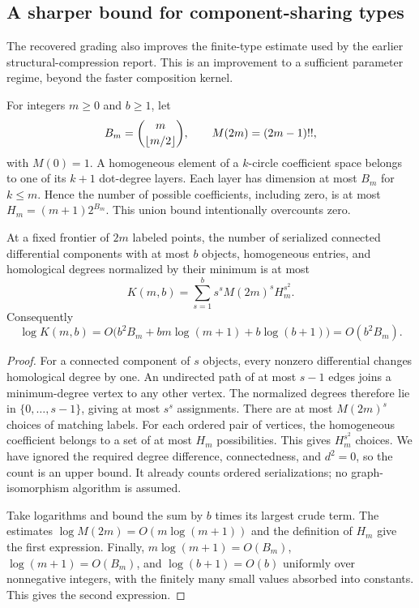 \subsection{A sharper bound for component-sharing types}
\label{sec:types}

The recovered grading also improves the finite-type estimate used by the
earlier structural-compression report. This is an improvement to a
sufficient parameter regime, beyond the faster composition kernel.

For integers $m\geq0$ and $b\geq1$, let
\[
 B_m=\binom{m}{\left\lfloor m/2\right\rfloor},\qquad M(2m)=(2m-1)!!,
\]
with $M(0)=1$. A homogeneous element of a $k$-circle coefficient space
belongs to one of its $k+1$ dot-degree layers. Each layer has dimension
at most $B_m$ for $k\leq m$. Hence the number of possible coefficients,
including zero, is at most $H_m=(m+1)2^{B_m}$. This union bound
intentionally overcounts zero.

\begin{theorem}
\label{thm:types}
At a fixed frontier of $2m$ labeled points, the number of serialized
connected differential components with at most $b$ objects, homogeneous
entries, and homological degrees normalized by their minimum is at most
\begin{equation}
 K(m,b)=\sum_{s=1}^{b}s^s M(2m)^s H_m^{s^2}.
 \label{eq:types}
\end{equation}
Consequently
\begin{equation}
 \log K(m,b)=O\bigl(b^2 B_m+b m\log(m+1)+b\log(b+1)\bigr)
 =O(b^2 B_m).
 \label{eq:typecost}
\end{equation}
\end{theorem}
\begin{proof}
For a connected component of $s$ objects, every nonzero differential
changes homological degree by one. An undirected path of at most $s-1$
edges joins a minimum-degree vertex to any other vertex. The normalized
degrees therefore lie in $\{0,\ldots,s-1\}$, giving at most $s^s$
assignments. There are at most $M(2m)^s$ choices of matching labels. For
each ordered pair of vertices, the homogeneous coefficient belongs to a
set of at most $H_m$ possibilities. This gives $H_m^{s^2}$ choices.
We have ignored the required degree difference, connectedness, and
$d^2=0$, so the count is an upper bound. It already counts ordered
serializations; no graph-isomorphism algorithm is assumed.

Take logarithms and bound the sum by $b$ times its largest crude term.
The estimates $\log M(2m)=O(m\log(m+1))$ and the definition of $H_m$
give the first expression. Finally, $m\log(m+1)=O(B_m)$,
$\log(m+1)=O(B_m)$, and $\log(b+1)=O(b)$ uniformly over nonnegative
integers, with the finitely many small values absorbed into constants.
This gives the second expression.
\end{proof}

